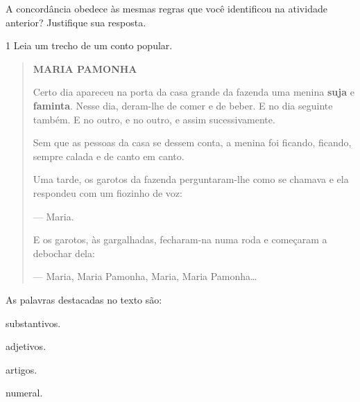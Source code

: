 \begin{escolha}
\begin{escolha}
{\begin{escolha}
\begin{escolha}
\item A concordância obedece às mesmas regras que você identificou na
  atividade anterior? Justifique sua resposta.

\end{escolha}


\num{1} Leia um trecho de um conto popular.

\begin{quote}
\textbf{MARIA PAMONHA}

Certo dia apareceu na porta da casa grande da fazenda uma menina
\textbf{suja} e \textbf{faminta}. Nesse dia, deram-lhe de comer e de
beber. E no dia seguinte também. E no outro, e no outro, e assim
sucessivamente.

Sem que as pessoas da casa se dessem conta, a menina foi ficando,
ficando, sempre calada e de canto em canto.

Uma tarde, os garotos da fazenda perguntaram-lhe como se chamava e ela
respondeu com um fiozinho de voz:

--- Maria.

E os garotos, às gargalhadas, fecharam-na numa roda e começaram a
debochar dela:

--- Maria, Maria Pamonha, Maria, Maria Pamonha\ldots{}
\end{quote}


As palavras destacadas no texto são:

\begin{escolha}
\item substantivos.

\item adjetivos.

\item artigos.

\item numeral.
\end{escolha}



\end{escolha}}
\end{escolha}
\end{escolha}
